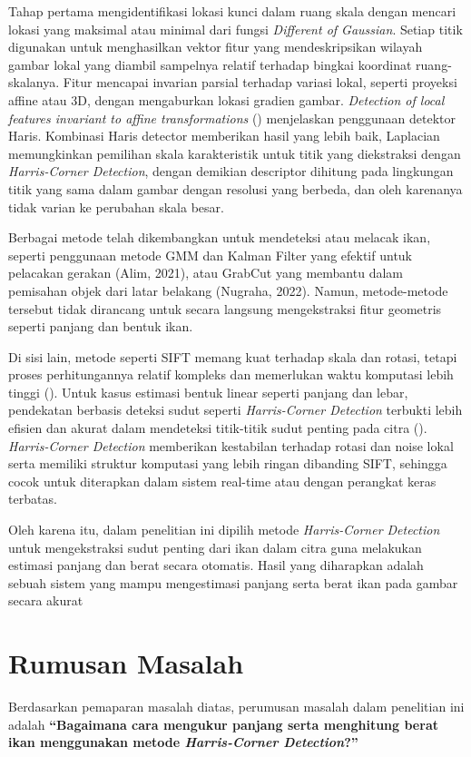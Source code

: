 Tahap pertama mengidentifikasi lokasi kunci dalam ruang skala dengan mencari lokasi yang maksimal atau minimal dari fungsi \emph{Different of Gaussian}. 
Setiap titik digunakan untuk menghasilkan vektor fitur yang mendeskripsikan wilayah gambar lokal yang diambil sampelnya relatif terhadap bingkai koordinat ruang-skalanya. Fitur mencapai invarian parsial terhadap variasi lokal, 
seperti proyeksi affine atau 3D, dengan mengaburkan lokasi gradien gambar. \emph{Detection of local features invariant to affine transformations} (\cite{Mikolajczyk2004}) menjelaskan penggunaan detektor Haris. 
Kombinasi Haris detector memberikan hasil yang lebih baik, Laplacian memungkinkan pemilihan skala karakteristik untuk titik yang diekstraksi dengan \emph{Harris-Corner Detection}, dengan demikian descriptor dihitung pada lingkungan titik yang sama dalam gambar dengan resolusi yang berbeda, dan oleh karenanya tidak varian ke perubahan skala besar.

Berbagai metode telah dikembangkan untuk mendeteksi atau melacak ikan, seperti penggunaan metode GMM dan Kalman Filter yang efektif untuk pelacakan gerakan (Alim, 2021), atau GrabCut yang membantu dalam pemisahan objek dari latar belakang (Nugraha, 2022). 
Namun, metode-metode tersebut tidak dirancang untuk secara langsung mengekstraksi fitur geometris seperti panjang dan bentuk ikan.

Di sisi lain, metode seperti SIFT memang kuat terhadap skala dan rotasi, tetapi proses perhitungannya relatif kompleks dan memerlukan waktu komputasi lebih tinggi (\cite{Lowe2004}). 
Untuk kasus estimasi bentuk linear seperti panjang dan lebar, pendekatan berbasis deteksi sudut seperti \emph{Harris-Corner Detection} terbukti lebih efisien dan akurat dalam mendeteksi titik-titik sudut penting pada citra (\cite{Harris2013}). 
\emph{Harris-Corner Detection} memberikan kestabilan terhadap rotasi dan noise lokal serta memiliki struktur komputasi yang lebih ringan dibanding SIFT, sehingga cocok untuk diterapkan dalam sistem real-time atau dengan perangkat keras terbatas.

Oleh karena itu, dalam penelitian ini dipilih metode \emph{Harris-Corner Detection} untuk mengekstraksi sudut penting dari ikan dalam citra guna melakukan estimasi panjang dan berat secara otomatis. 
Hasil yang diharapkan adalah sebuah sistem yang mampu mengestimasi panjang serta berat ikan pada gambar secara akurat


\section{Rumusan Masalah}
Berdasarkan pemaparan masalah diatas, perumusan masalah dalam penelitian ini adalah \textbf{“Bagaimana cara mengukur panjang serta menghitung berat ikan menggunakan metode \emph{Harris-Corner Detection}?”}

